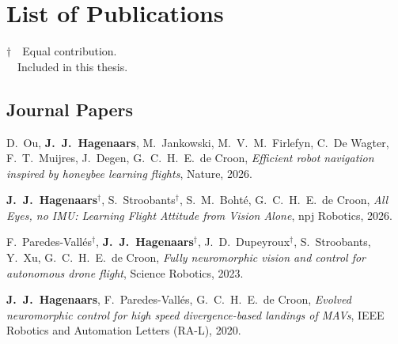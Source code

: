 \chapter*{List of Publications}
\label{publications}

\noindent
$\dagger$~~Equal contribution.\\
\faFileTextO~~Included in this thesis.
\section*{Journal Papers}
\vspace{5pt}
\begin{etaremune}{\small
	\item[4.] D.\ Ou, \textbf{J.\ J.\ Hagenaars}, M.\ Jankowski, M.\ V.\ M.\ Firlefyn, C.\ De Wagter, F.\ T.\ Muijres, J.\ Degen, G.\ C.\ H.\ E.\ de Croon, \emph{Efficient robot navigation inspired by honeybee learning flights}, Nature, 2026.
	\item[\faFileTextO~~\hspace{4pt}3.] \textbf{J.\ J.\ Hagenaars}$^\dagger$, S.\ Stroobants$^\dagger$, S.\ M.\ Boht\'e, G.\ C.\ H.\ E.\ de Croon, \emph{All Eyes, no IMU: Learning Flight Attitude from Vision Alone}, npj Robotics, 2026.
	\item[\faFileTextO~~\hspace{4pt}2.] F.\ Paredes-Vall\'es$^\dagger$, \textbf{J.\ J.\ Hagenaars}$^\dagger$, J.\ D.\ Dupeyroux$^\dagger$, S.\ Stroobants, Y.\ Xu, G.\ C.\ H.\ E.\ de Croon, \emph{Fully neuromorphic vision and control for autonomous drone flight}, Science Robotics, 2023.
	\item[1.] \textbf{J.\ J.\ Hagenaars}, F.\ Paredes-Vall\'es, G.\ C.\ H.\ E.\ de Croon, \emph{Evolved neuromorphic control for high speed divergence-based landings of MAVs}, IEEE Robotics and Automation Letters (RA-L), 2020.
}\end{etaremune}

